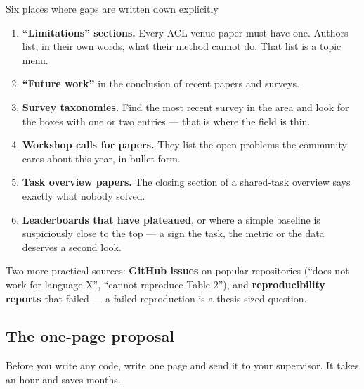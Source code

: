 \documentclass[11pt,a4paper]{article}
\begin{document}
\begin{cbox}{Six places where gaps are written down explicitly}
\begin{enumerate}
  \item \textbf{``Limitations'' sections.} Every ACL-venue paper must have one.
        Authors list, in their own words, what their method cannot do. That
        list is a topic menu.
  \item \textbf{``Future work''} in the conclusion of recent papers and
        surveys.
  \item \textbf{Survey taxonomies.} Find the most recent survey in the area
        and look for the boxes with one or two entries --- that is where the
        field is thin.
  \item \textbf{Workshop calls for papers.} They list the open problems the
        community cares about this year, in bullet form.
  \item \textbf{Task overview papers.} The closing section of a shared-task
        overview says exactly what nobody solved.
  \item \textbf{Leaderboards that have plateaued}, or where a simple baseline
        is suspiciously close to the top --- a sign the task, the metric or
        the data deserves a second look.
\end{enumerate}
\end{cbox}

Two more practical sources: \textbf{GitHub issues} on popular repositories
(``does not work for language X'', ``cannot reproduce Table 2''), and
\textbf{reproducibility reports} that failed --- a failed reproduction is a
thesis-sized question.

\subsection{The one-page proposal}

Before you write any code, write one page and send it to your supervisor. It
takes an hour and saves months.
\end{document}
